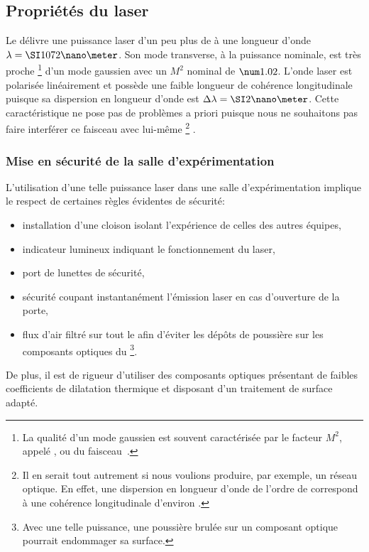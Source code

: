 \subsection{Propriétés du laser}

Le \lyb délivre une puissance laser d'un peu plus de  à une longueur d'onde $\LO = \nm{1072}$.
Son mode transverse, à la puissance nominale, est très proche%
\footnote{La qualité d'un mode gaussien \temzz est souvent caractérisée par le facteur  $M^2$, appelé , ou  du faisceau~\cite{SaT91}.}
 d'un mode gaussien \temzz avec un $M^2$ nominal de $\val{1.02}$.
L'onde laser est polarisée linéairement et possède une faible longueur de cohérence longitudinale puisque sa dispersion en longueur d'onde est $\Delta \LO = \nm{2}$. Cette caractéristique ne pose pas de problèmes a priori puisque nous ne souhaitons pas faire interférer ce faisceau avec lui-même%
\footnote{Il en serait tout autrement si nous voulions produire, par exemple, un réseau optique. En effet, une dispersion en longueur d'onde de l'ordre de  correspond à une cohérence longitudinale d'environ .}%
. 

\casse

\subsubsection{Mise en sécurité de la salle d'expérimentation}
L'utilisation d'une telle puissance laser dans une salle d'expérimentation implique le respect de certaines règles évidentes de sécurité:
\begin{itemize}
	\item installation d'une cloison isolant l'expérience de celles des autres équipes,
	\item indicateur lumineux indiquant le fonctionnement du laser,
	\item port de lunettes de sécurité,
	\item sécurité coupant instantanément l'émission laser en cas d'ouverture de la porte,
	\item flux d'air filtré sur tout le \setup afin d'éviter les dépôts de poussière sur les composants optiques du \ldp%
	\footnote{Avec une telle puissance, une poussière brulée sur un composant optique pourrait endommager sa surface.
	}.
\end{itemize}
De plus, il est de rigueur d'utiliser des composants optiques présentant de faibles coefficients de dilatation thermique et disposant d'un traitement de surface adapté. 

